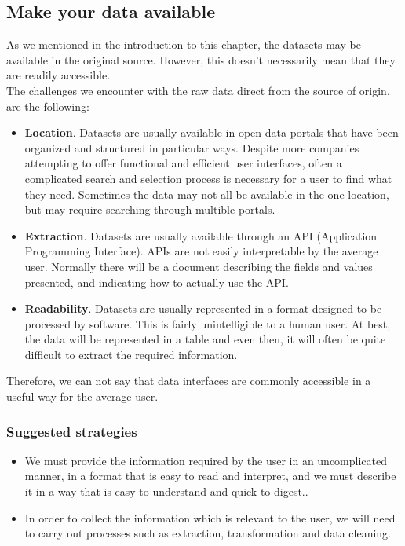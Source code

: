 \subsection{Make your data available}
    
As we mentioned in the introduction to this chapter, the datasets may be available in the original source. However, this doesn't necessarily
mean that they are readily accessible.\\

The challenges we encounter with the raw data direct from the source of origin, are the following:

\begin{itemize}
    \item \textbf{Location}. Datasets are usually available in open data portals that have been organized and structured in particular ways.
    Despite more companies attempting to offer functional and efficient user interfaces, often a complicated search and selection process is necessary for a user to find what they need.
    Sometimes the data may not all be available in the one location, but may require searching through multible portals.

    \item \textbf{Extraction}. Datasets are usually available through an API (Application Programming Interface). APIs are not easily interpretable by the average user.
    Normally there will be a document describing the fields and values presented, and indicating how to actually use the API. \\

    \item \textbf{Readability}. Datasets are usually represented in a format designed to be processed by software. This is fairly unintelligible to a human user. At best,
    the data will be represented in a table and even then, it will often be quite difficult to extract the required information.
\end{itemize}

Therefore, we can not say that data interfaces are commonly accessible in a useful way for the average user. \\

\subsubsection*{Suggested strategies} 

\begin{itemize}
    \item We must provide the information required by the user in an uncomplicated manner, in a format that is easy to read and interpret,
          and we must describe it in a way that is easy to understand and quick to digest..\\
    \item In order to collect the information which is relevant to the user, we will need to carry out processes such as extraction, transformation and
          data cleaning.
\end{itemize}
 
